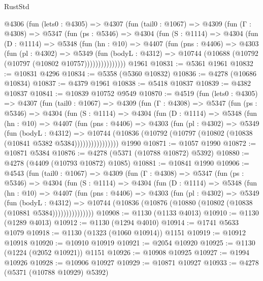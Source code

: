 \begin{lexlean}{RustStd}
\begin{coremodule}
{\begin{coremodule}
{{{{{{{{{{{{{{{{{{{{{{{{{{{{{{{{{{{    @4306
      (fun (lets0 : @4305) =>
      @4307
        (fun (tail0 : @1067) =>
        @4309
          (fun (Γ : @4308) =>
          @5347
            (fun (ps : @5346) =>
            @4304
              (fun (S : @1114) =>
              @4304
                (fun (D : @1114) =>
                @5348
                  (fun (hn : @10) =>
                  @4407
                    (fun (pns : @4406) =>
                    @4303
                      (fun (pl : @4302) =>
                      @5349
                        (fun (bodyL : @4312) =>
                        @10744 (@10688 (@10792 (@10797 (@10802 @10757)))))))))))))))
    @1961
@10831 := @5361 @1961
@10832 := @10831 @4296
@10834 := @5358 (@5360 @10832)
@10836 := @4278 (@10686 @10834)
@10837 := @4379 @1961
@10838 := @5418 @10837
@10839 := @4382 @10837
@10841 := @10839 @10752 @9549
@10870 := @4519
    (fun (lets0 : @4305) =>
    @4307
      (fun (tail0 : @1067) =>
      @4309
        (fun (Γ : @4308) =>
        @5347
          (fun (ps : @5346) =>
          @4304
            (fun (S : @1114) =>
            @4304
              (fun (D : @1114) =>
              @5348
                (fun (hn : @10) =>
                @4407
                  (fun (pns : @4406) =>
                  @4303
                    (fun (pl : @4302) =>
                    @5349
                      (fun (bodyL : @4312) =>
                      @10744
                        (@10836 (@10792 (@10797 (@10802 (@10838 (@10841 @5382 @5384))))))))))))))))
    @1990
@10871 := @1057 @1990
@10872 := @10871 @5384
@10876 := @4278 (@5371 (@10788 @10872) @5392)
@10880 := @4278 (@4409 (@10793 @10872) @1085)
@10881 := @10841 @1990
@10906 := @4543
    (fun (tail0 : @1067) =>
    @4309
      (fun (Γ : @4308) =>
      @5347
        (fun (ps : @5346) =>
        @4304
          (fun (S : @1114) =>
          @4304
            (fun (D : @1114) =>
            @5348
              (fun (hn : @10) =>
              @4407
                (fun (pns : @4406) =>
                @4303
                  (fun (pl : @4302) =>
                  @5349
                    (fun (bodyL : @4312) =>
                    @10744 (@10836 (@10876 (@10880 (@10802 (@10838 (@10881 @5384)))))))))))))))
@10908 := @1130 (@1133 @4013)
@10910 := @1130 (@1289 @4013)
@10912 := @1130 (@1294 @4010)
@10914 := @1741 @5633 @1079
@10918 := @1130 (@1323 (@1060 @10914)) @1151
@10919 := @10912 @10918
@10920 := @10910 @10919
@10921 := @2054 @10920
@10925 := @1130 (@1224 (@2052 @10921)) @1151
@10926 := @10908 @10925
@10927 := @1994 @10926
@10928 := @10906 @10927
@10929 := @10871 @10927
@10933 := @4278 (@5371 (@10788 @10929) @5392)
}}}}}}}}}}}}}}}}}}}}}}}}}}}}}}}}}}}
\end{coremodule}}
\end{coremodule}
\end{lexlean}
